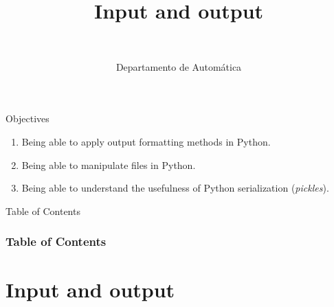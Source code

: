 \documentclass[10pt,compress]{beamer} %
\title[Input and output]{Input and output}
\author{\asignatura\\\carrera}
\institute{}
\date{Departamento de Automática}
\begin{document}
{\titlepageBlue
    \begin{frame}
        \titlepage
    \end{frame}
}

\institute{\asignatura}

\begin{frame}[plain]{}
	\begin{block}{Objectives}
		\begin{enumerate}
		\item Being able to apply output formatting methods in Python.
		\item Being able to manipulate files in Python.
		\item Being able to understand the usefulness of Python serialization (\textit{pickles}).
		\end{enumerate}
	\end{block}
\end{frame}

{
\begin{frame}[shrink]{Table of Contents}
 \frametitle{Table of Contents}
 \tableofcontents
\end{frame}
}

\section{Input and output}
\end{document}
